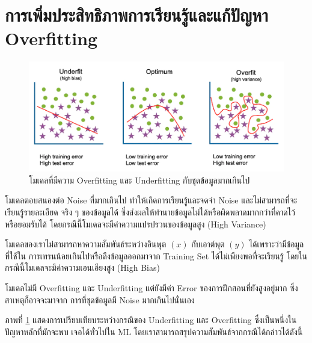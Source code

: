 \section{การเพิ่มประสิทธิภาพการเรียนรู้และแก้ปัญหา Overfitting}
\label{sec:fix_overfit}

\begin{figure}[htbp]
    \centering
    \includegraphics[width=\linewidth]{fig/overfitting.png}
    \caption{โมเดลที่มีความ Overfitting และ Underfitting กับชุดข้อมูลมากเกินไป}
    \label{fig:overfitting}
\end{figure}

\begin{description}[style=nextline]
    \item[Overfitting] โมเดลตอบสนองต่อ Noise ที่มากเกินไป ทำให้เกิดการเรียนรู้และจดจำ Noise และไม่สามารถที่จะเรียนรู้รายละเอียด%
    จริง ๆ ของข้อมูลได้ ซึ่งส่งผลให้ทำนายข้อมูลไม่ได้หรือผิดพลาดมากกว่าที่คาดไว้หรือยอมรับได้ โดยกรณีนี้โมเดลจะมีค่าความแปรปรวนของข้อมูลสูง 
    (High Variance)
    
    \item[Underfitting] โมเดลของเราไม่สามารถหาความสัมพันธ์ระหว่างอินพุต $(x)$ กับเอาต์พุต $(y)$ ได้เพราะว่ามีข้อมูลที่ใช้ใน%
    การเทรนน้อยเกินไปหรือดึงข้อมูลออกมาจาก Training Set ได้ไม่เพียงพอที่จะเรียนรู้ โดยในกรณีนี้โมเดลจะมีค่าความเอนเอียงสูง (High Bias)

    \item[Noisy] โมเดลไม่มี Overfitting และ Underfitting แต่ยังมีค่า Error ของการฝึกสอนที่ยังสูงอยู่มาก ซึ่งสาเหตุก็อาจจะมาจาก%
    การที่ชุดข้อมูลมี Noise มากเกินไปนั่นเอง
\end{description}

ภาพที่ \ref{fig:overfitting} แสดงการเปรียบเทียบระหว่างกรณีของ Underfitting และ Overfitting ซึ่งเป็นหนึ่งในปัญหาหลักที่มักจะพบ%
เจอได้ทั่วไปใน ML โดยเราสามารถสรุปความสัมพันธ์จากกรณีได้กล่าวได้ดังนี้


